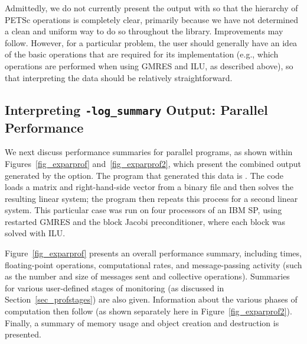 Admittedly, we do not currently present the output with
 so that the hierarchy of PETSc operations is completely
clear, primarily because we have not determined a clean and uniform
way to do so throughout the library.  Improvements may follow.
However, for a particular problem, the user should generally have
an idea of the basic operations that are required for its
implementation (e.g., which operations are performed when using GMRES
and ILU, as described above), so that interpreting the 
data should be relatively straightforward.

\subsection{Interpreting {\tt -log\_summary} Output: Parallel Performance}
\label{sec_parperformance}

We next discuss performance summaries for parallel programs,
 as shown within Figures~\ref{fig_exparprof}
and~\ref{fig_exparprof2}, which present the combined output generated by
the  option.  The program that generated this data is
\href{http://www.mcs.anl.gov/petsc/petsc-current/src/ksp/ksp/examples/tutorials/ex10.c.html}{}.  
The code loads a
matrix and right-hand-side vector from a binary file and then solves
the resulting linear system; the program then repeats this process for
a second linear system.  This particular case was run on four
processors of an IBM SP, using restarted GMRES and the block Jacobi
preconditioner, where each block was solved with ILU.

Figure~\ref{fig_exparprof} presents an overall performance summary,
including times, floating-point operations, computational rates, and
message-passing activity (such as the number and size of messages sent
and collective operations).  Summaries for various user-defined stages
of monitoring (as discussed in Section~\ref{sec_profstages}) are also
given. Information about the various phases of computation then follow
(as shown separately here in Figure~\ref{fig_exparprof2}).
Finally, a summary of memory usage and object creation and destruction
is presented.


